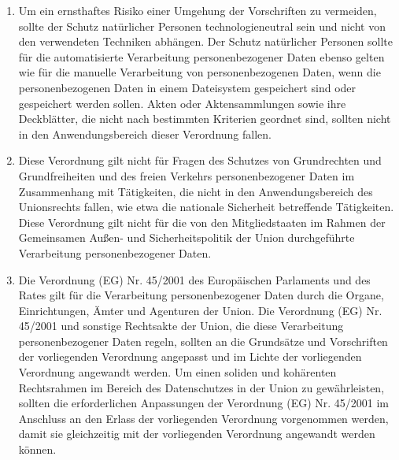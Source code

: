 \begin{enumerate}

   \item Um ein ernsthaftes Risiko einer Umgehung der Vorschriften zu vermeiden, sollte der Schutz natürlicher Personen
    technologieneutral sein und nicht von den verwendeten Techniken abhängen. Der Schutz natürlicher Personen sollte
    für die automatisierte Verarbeitung personenbezogener Daten ebenso gelten wie für die manuelle Verarbeitung von
    personenbezogenen Daten, wenn die personenbezogenen Daten in einem Dateisystem gespeichert sind oder gespeichert
    werden sollen. Akten oder Aktensammlungen sowie ihre Deckblätter, die nicht nach bestimmten Kriterien geordnet
    sind, sollten nicht in den Anwendungsbereich dieser Verordnung fallen.%
   \label{itm:eg-15}
   

   \item Diese Verordnung gilt nicht für Fragen des Schutzes von Grundrechten und Grundfreiheiten und des freien
    Verkehrs personenbezogener Daten im Zusammenhang mit Tätigkeiten, die nicht in den Anwendungsbereich des
    Unionsrechts fallen, wie etwa die nationale Sicherheit betreffende Tätigkeiten. Diese Verordnung gilt nicht für die
    von den Mitgliedstaaten im Rahmen der Gemeinsamen Außen- und Sicherheitspolitik der Union durchgeführte
    Verarbeitung personenbezogener Daten.%
   \label{itm:eg-16}
   

   \item Die Verordnung (EG) Nr. 45/2001 des Europäischen Parlaments und des Rates gilt für die Verarbeitung personenbezogener Daten durch die Organe,
    Einrichtungen, Ämter und Agenturen der Union. Die Verordnung (EG) Nr. 45/2001 und sonstige Rechtsakte der Union,
    die diese Verarbeitung personenbezogener Daten regeln, sollten an die Grundsätze und Vorschriften der vorliegenden
    Verordnung angepasst und im Lichte der vorliegenden Verordnung angewandt werden. Um einen soliden und kohärenten
    Rechtsrahmen im Bereich des Datenschutzes in der Union zu gewährleisten, sollten die erforderlichen Anpassungen der
    Verordnung (EG) Nr. 45/2001 im Anschluss an den Erlass der vorliegenden Verordnung vorgenommen werden, damit sie
    gleichzeitig mit der vorliegenden Verordnung angewandt werden können.%
   \label{itm:eg-17}
   

\end{enumerate}
